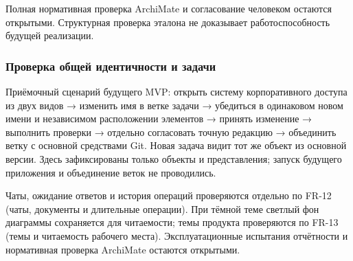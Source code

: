 \documentclass[10pt,a4paper]{article}
\begin{document}
Полная нормативная проверка ArchiMate и согласование человеком остаются открытыми. Структурная проверка эталона не доказывает работоспособность будущей реализации.

\subsubsection{Проверка общей идентичности и задачи}\label{ux43fux440ux43eux432ux435ux440ux43aux430-ux43eux431ux449ux435ux439-ux438ux434ux435ux43dux442ux438ux447ux43dux43eux441ux442ux438-ux438-ux437ux430ux434ux430ux447ux438}

Приёмочный сценарий будущего MVP: открыть систему корпоративного доступа из двух видов → изменить имя в ветке задачи → убедиться в одинаковом новом имени и независимом расположении элементов → принять изменение → выполнить проверки → отдельно согласовать точную редакцию → объединить ветку с основной средствами Git. Новая задача видит тот же объект из основной версии. Здесь зафиксированы только объекты и представления; запуск будущего приложения и объединение веток не проводились.

Чаты, ожидание ответов и история операций проверяются отдельно по FR-12 (чаты, документы и длительные операции). При тёмной теме светлый фон диаграммы сохраняется для читаемости; темы продукта проверяются по FR-13 (темы и читаемость рабочего места). Эксплуатационные испытания отчётности и нормативная проверка ArchiMate остаются открытыми.

\end{document}
